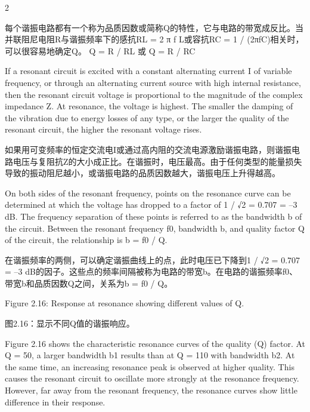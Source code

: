 \documentclass{ctexbook}
\begin{document}
\begin{paracol}{2}
\switchcolumn

每个谐振电路都有一个称为品质因数或简称Q的特性，它与电路的带宽成反比。当并联阻尼电阻R与谐振频率下的感抗RL = 2 π f L或容抗RC = 1 / (2πfC)相关时，可以很容易地确定Q。
Q = R / RL 或 Q = R / RC

\switchcolumn*

If a resonant circuit is excited with a constant alternating current I of variable frequency, 
or through an alternating current source with high internal resistance, then the resonant 
circuit voltage is proportional to the magnitude of the complex impedance Z. At resonance, 
the voltage is highest. The smaller the damping of the vibration due to energy losses of any 
type, or the larger the quality of the resonant circuit, the higher the resonant voltage rises. 

\switchcolumn

如果用可变频率的恒定交流电I或通过高内阻的交流电源激励谐振电路，则谐振电路电压与复阻抗Z的大小成正比。在谐振时，电压最高。由于任何类型的能量损失导致的振动阻尼越小，或谐振电路的品质因数越大，谐振电压上升得越高。

\switchcolumn*

On both sides of the resonant frequency, points on the resonance curve can be determined 
at which the voltage has dropped to a factor of 1 / √2 = 0.707 = –3 dB. The frequency 
separation of these points is referred to as the bandwidth b of the circuit. Between the 
resonant frequency f0, bandwidth b, and quality factor Q of the circuit, the relationship is 
b = f0 / Q. 

\switchcolumn

在谐振频率的两侧，可以确定谐振曲线上的点，此时电压已下降到1 / √2 = 0.707 = –3 dB的因子。这些点的频率间隔被称为电路的带宽b。在电路的谐振频率f0、带宽b和品质因数Q之间，关系为b = f0 / Q。

\switchcolumn*

Figure 2.16: Response at resonance showing different values of Q. 

\switchcolumn

图2.16：显示不同Q值的谐振响应。

\switchcolumn*

Figure 2.16 shows the characteristic resonance curves of the quality (Q) factor. At Q = 50, 
a larger bandwidth b1 results than at Q = 110 with bandwidth b2. At the same time, an 
increasing resonance peak is observed at higher quality. This causes the resonant circuit to 
oscillate more strongly at the resonance frequency. However, far away from the resonant 
frequency, the resonance curves show little difference in their response. 


\end{paracol}
\end{document}
